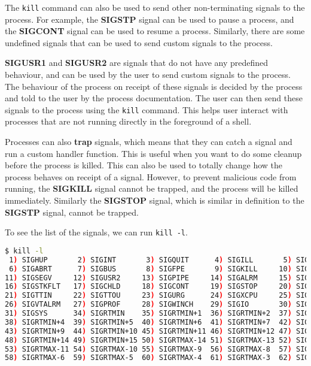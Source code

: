 The \texttt{kill} command can also be used to send other non-terminating signals
to the process. For example, the \textbf{SIGSTP} signal can be used to pause
a process, and the \textbf{SIGCONT} signal can be used to resume a process.
Similarly, there are some undefined signals that can be used to send custom
signals to the process.

\textbf{SIGUSR1} and \textbf{SIGUSR2} are signals that do not have any predefined
behaviour, and can be used by the user to send custom signals to the process.
The behaviour of the process on receipt of these signals is decided by the
process and told to the user by the process documentation. The user can
then send these signals to the process using the \texttt{kill} command.
This helps user interact with processes that are not running directly in the
foreground of a shell.

Processes can also \textbf{trap} signals, which means that they can catch
a signal and run a custom handler function. This is useful when you want
to do some cleanup before the process is killed. This can also be used
to totally change how the process behaves on receipt of a signal.
However, to prevent malicious code from running, the \textbf{SIGKILL} signal
cannot be trapped, and the process will be killed immediately. Similarly
the \textbf{SIGSTOP} signal, which is similar in definition to the \textbf{SIGSTP}
signal, cannot be trapped.

To see the list of the signals, we can run \texttt{kill -l}.

\begin{lstlisting}[language=bash]
$ kill -l
 1) SIGHUP       2) SIGINT       3) SIGQUIT      4) SIGILL       5) SIGTRAP
 6) SIGABRT      7) SIGBUS       8) SIGFPE       9) SIGKILL     10) SIGUSR1
11) SIGSEGV     12) SIGUSR2     13) SIGPIPE     14) SIGALRM     15) SIGTERM
16) SIGSTKFLT   17) SIGCHLD     18) SIGCONT     19) SIGSTOP     20) SIGTSTP
21) SIGTTIN     22) SIGTTOU     23) SIGURG      24) SIGXCPU     25) SIGXFSZ
26) SIGVTALRM   27) SIGPROF     28) SIGWINCH    29) SIGIO       30) SIGPWR
31) SIGSYS      34) SIGRTMIN    35) SIGRTMIN+1  36) SIGRTMIN+2  37) SIGRTMIN+3
38) SIGRTMIN+4  39) SIGRTMIN+5  40) SIGRTMIN+6  41) SIGRTMIN+7  42) SIGRTMIN+8
43) SIGRTMIN+9  44) SIGRTMIN+10 45) SIGRTMIN+11 46) SIGRTMIN+12 47) SIGRTMIN+13
48) SIGRTMIN+14 49) SIGRTMIN+15 50) SIGRTMAX-14 51) SIGRTMAX-13 52) SIGRTMAX-12
53) SIGRTMAX-11 54) SIGRTMAX-10 55) SIGRTMAX-9  56) SIGRTMAX-8  57) SIGRTMAX-7
58) SIGRTMAX-6  59) SIGRTMAX-5  60) SIGRTMAX-4  61) SIGRTMAX-3  62) SIGRTMAX-2
\end{lstlisting}

